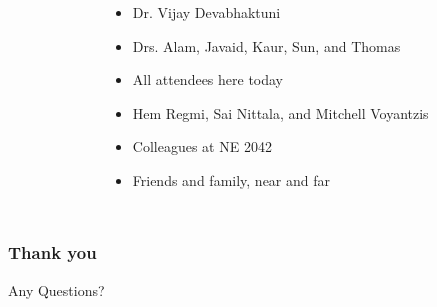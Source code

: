 \documentclass{beamer}
\newenvironment{figure*}%
{\begin{figure}}
{\end{figure}}
\begin{document}
\begin{frame}
\begin{columns}[c]
\begin{figure}
	\label{ann-saphyre}
	\end{figure}
	
\begin{itemize}
\item Dr. Vijay Devabhaktuni
\item Drs. Alam, Javaid, Kaur, Sun, and Thomas
\item All attendees here today
\item Hem Regmi, Sai Nittala, and Mitchell Voyantzis
\item Colleagues at NE 2042
\item Friends and family, near and far
\end{itemize}
\end{columns}
\end{frame}

\begin{frame}
\frametitle{Thank you}
\Huge{\centerline{Any Questions?}}
\end{frame}

\end{document}
